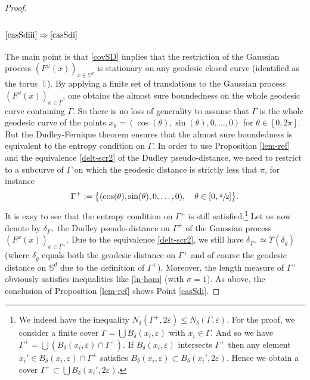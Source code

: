 \documentclass[10pt]{amsart}
\theoremstyle{theorem}
\theoremstyle{definition}
\newcommand\bbS{\mathbb{S}}
\newcommand\ep{\varepsilon}
\begin{document}
\begin{proof}
\subsubsection*{$\eqref{casSdiii}\Rightarrow\eqref{casSdi}$}
The main point is that \eqref{covSD} implies that the restriction of the Gaussian process $(F^\omega(x))_{x\in\bbS^d}$ is stationary on any geodesic closed curve (identified as the torus~$\mathbb{T}$).
By applying a finite set of translations to the Gaussian process $(F^\omega(x))_{x\in \Gamma}$, one obtains the almost sure boundedness on the whole geodesic curve containing $\Gamma$.
So there is no loss of generality to assume that $\Gamma$ is the whole geodesic curve of the points $x_\theta=(\cos(\theta),\sin(\theta),0,\dots,0)$ for $\theta \in [0,2\pi]$.
But the Dudley-Fernique theorem ensures that the almost sure boundedness is equivalent to the entropy condition on $\Gamma$.
In order to use Proposition \ref{lem-ref} and the equivalence \eqref{delt-scr2} of the Dudley pseudo-distance, we need to restrict to a subcurve of $\Gamma$ on which the geodesic distance is strictly less that $\pi$, for instance
\begin{equation}\label{gammapl}
\Gamma^{+}:=\bigl\{(\cos(\theta),\sin(\theta),0,\dots,0),\quad \theta \in[0,\sfrac{\pi}{2}] \bigr\}.
\end{equation}
It is easy to see that the entropy condition on $\Gamma^{+}$ is still satisfied.\footnote{We indeed have the inequality $N_{\delta}(\Gamma^+,2\ep)\leq N_{\delta}(\Gamma,\ep)$. For the proof, we consider a finite cover $\Gamma=\bigcup B_{\delta}(x_i,\ep)$ with $x_i\in \Gamma$.
And so we have $\Gamma^+=\bigcup (B_{\delta}(x_i,\ep)\cap \Gamma^+)$.
If $B_{\delta}(x_i,\ep)$ intersects $\Gamma^+$ then any element $x_i'\in B_{\delta}(x_i,\ep)\cap \Gamma^{+}$ satisfies $B_{\delta}(x_i,\ep)\subset B_{\delta}(x_i',2\ep)$. Hence we obtain a cover $\Gamma^+\subset \bigcup B_{\delta}(x_i',2\ep)$.}
Let us now denote by $\delta_{\Gamma^+}$ the Dudley pseudo-distance on $\Gamma^+$ of the Gaussian process $(F^\omega(x))_{x\in \Gamma^+}$. Due to the equivalence \eqref{delt-scr2}, we still have $\delta_{\Gamma^+}\simeq \Upsilon(\delta_g)$ (where $\delta_g$ equals both the geodesic distance on $\Gamma^{+}$ and of course the geodesic distance on $\bbS^d$ due to the definition of $\Gamma^{+}$). Moreover, the length measure of $\Gamma^+$ obviously satisfies inequalities like \eqref{ln-hom} (with $\sigma=1$). As above, the conclusion of Proposition \ref{lem-ref} shows Point \eqref{casSdi}.
\end{proof}
\end{document}
